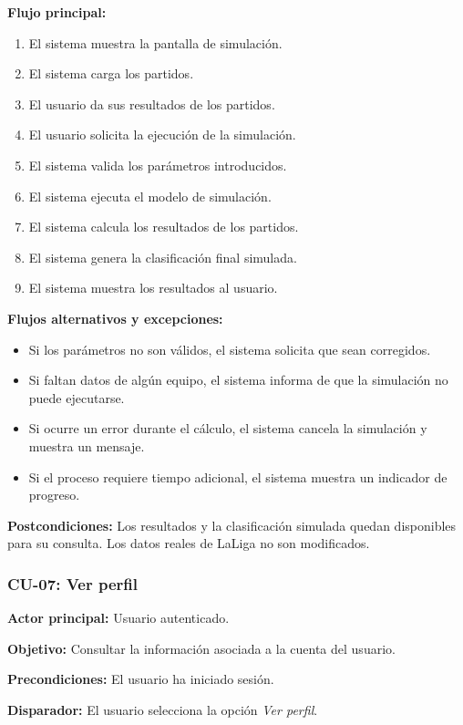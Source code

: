 \noindent \textbf{Flujo principal:}
\begin{enumerate}
    \item El sistema muestra la pantalla de simulación.
    \item El sistema carga los partidos.
    \item El usuario da sus resultados de los partidos.
    \item El usuario solicita la ejecución de la simulación.
    \item El sistema valida los parámetros introducidos.
    \item El sistema ejecuta el modelo de simulación.
    \item El sistema calcula los resultados de los partidos.
    \item El sistema genera la clasificación final simulada.
    \item El sistema muestra los resultados al usuario.
\end{enumerate}

\noindent \textbf{Flujos alternativos y excepciones:}
\begin{itemize}
    \item Si los parámetros no son válidos, el sistema solicita que sean corregidos.
    \item Si faltan datos de algún equipo, el sistema informa de que la simulación no puede ejecutarse.
    \item Si ocurre un error durante el cálculo, el sistema cancela la simulación y muestra un mensaje.
    \item Si el proceso requiere tiempo adicional, el sistema muestra un indicador de progreso.
\end{itemize}

\noindent \textbf{Postcondiciones:} Los resultados y la clasificación simulada quedan disponibles para su consulta. Los datos reales de LaLiga no son modificados.

\subsubsection{CU-07: Ver perfil}

\noindent \textbf{Actor principal:} Usuario autenticado.

\noindent \textbf{Objetivo:} Consultar la información asociada a la cuenta del usuario.

\noindent \textbf{Precondiciones:} El usuario ha iniciado sesión.

\noindent \textbf{Disparador:} El usuario selecciona la opción \textit{Ver perfil}.

